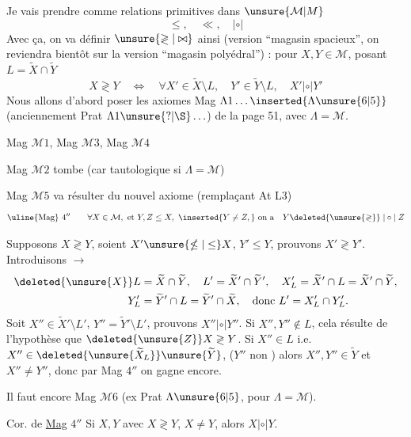 Je vais prendre comme relations primitives dans $\unsure{\mathcal M|M}$
\[
\leq,\quad\ll,\quad\mathrel{|\circ|}
\]
Avec ça, on va définir $\unsure{\gtrless|\bowtie}$ ainsi (version  ``magasin spacieux'', on reviendra bientôt sur la version ``magasin polyédral'') : pour $X,Y\in\mathcal M$, posant $L=\widetilde X\cap\widetilde Y$ 
\[
X\gtrless Y\quad\Longleftrightarrow\quad\forall X'\in\widetilde X\setminus L,\quad Y'\in\widetilde Y\setminus L,\quad X'\mathrel{|\circ|}Y'
\]
Nous allons d'abord poser les axiomes Mag $\Lambda1\ldots\inserted{\Lambda\unsure{6|5}}$ (anciennement Prat $\Lambda1\unsure{\text{?}|\S}\ldots$) de la page 51, avec $\Lambda=\mathcal M$.

Mag $\mathcal M1$, Mag $\mathcal M3$, Mag $\mathcal M4$  

Mag $\mathcal M2$ tombe (car  tautologique si $\Lambda=\mathcal M$)

Mag $\mathcal M5$  va résulter du nouvel axiome (remplaçant At L3)
\[
\text{\uline{Mag} }4''\qquad\forall X\in\mathcal M,\ \text{et }Y,Z\leq X,\ \inserted{Y\ne Z,}\ \text{on a}\quad Y\deleted{\unsure{\gtrless}}\mathrel{|\circ|}Z
\]

Supposons $X\gtrless Y$, soient $X'\unsure{\nleq|\leq}X$, $Y'\leq Y$, prouvons $X'\gtrless Y'$. Introduisons $\longrightarrow$
\[
\begin{aligned}
\deleted{\unsure{X}}L&=\widetilde X\cap\widetilde Y,\quad L'=\widetilde X'\cap\widetilde Y',\quad X'_L=\widetilde X'\cap L=\widetilde X'\cap\widetilde Y,\\
Y'_L&=\widetilde Y'\cap L=\widetilde Y'\cap\widetilde X,\quad\text{donc }L'=X'_L\cap Y'_L.
\end{aligned}
\]
Soit $X''\in\widetilde X'\setminus L'$, $Y''=\widetilde Y'\setminus L'$, prouvons $X''\mathrel{|\circ|}Y''$. Si $X'',Y''\notin L$, cela résulte de l'hypothèse que $\deleted{\unsure{Z}}X\gtrless Y$. Si $X''\in L$ i.e. $X''\in\deleted{\unsure{\widetilde X_L}}\unsure{\widetilde Y}$, ($Y''$ non ) alors $X'',Y''\in\widetilde Y$ et $X''\ne Y''$, donc par Mag $4''$ on gagne encore.

Il faut encore  Mag $\mathcal M6$ (ex Prat $\Lambda\unsure{6|5}$, pour $\Lambda=\mathcal M$).

Cor. de \uline{Mag} $4''$ Si $X,Y$ avec $X\gtrless Y$, $X\ne Y$, alors $X\mathrel{|\circ|}Y$.
